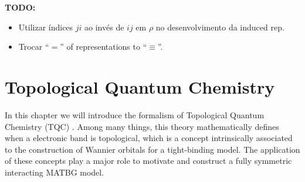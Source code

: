 


\textbf{TODO:}
\begin{itemize}
\item Utilizar índices $ji$ ao invés de $ij$ em $\rho$ no desenvolvimento da induced rep.
\item Trocar ``$=$'' of representations to ``$\equiv$''.
\end{itemize}


\chapter{Topological Quantum Chemistry}

In this chapter we will introduce the formalism of Topological Quantum Chemistry (TQC) \cite{topological_quantum_chemistry2017, building_blocks2018, lectures_tms2017}. Among many things, this theory mathematically defines when a electronic band is topological, which is a concept intrinsically associated to the construction of Wannier orbitals for a tight-binding model. The application of these concepts play a major role to motivate and construct a fully symmetric interacting MATBG model.

